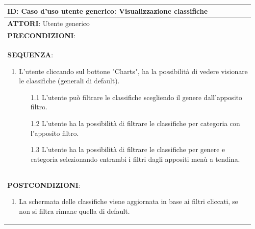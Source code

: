 \documentclass[a4paper,11pt]{report}
\begin{document}
\begin{table}[h!]
    \renewcommand*{\arraystretch}{1.2}
    \centering
    \begin{tabularx}{\textwidth}{|X|} \hline
      \textbf{ID}: Caso d'uso utente generico: 
      \newline 
      Visualizzazione classifiche \\
      \hline
      \textbf{ATTORI}: Utente generico \\
      \hline
      \textbf{PRECONDIZIONI}:\\
      \hline
      \textbf{SEQUENZA}:
      \begin{enumerate}
        \item L'utente cliccando sul bottone "Charts", ha la possibilità di vedere visionare le classifiche (generali di default).
        \begin{enumerate}
            \item [1.1] L'utente può filtrare le classifiche scegliendo il genere dall'apposito filtro.
            \item [1.2] L'utente ha la possibilità di filtrare le classifiche per categoria con l'apposito filtro.
             \item [1.3] L'utente ha la possibilità di filtrare le classifiche per genere e categoria selezionando entrambi i filtri dagli appositi menù a tendina.
         \end{enumerate}
      \end{enumerate}\\
      \hline
      \textbf{POSTCONDIZIONI}:
      \begin{enumerate}
        \item La schermata delle classifiche viene aggiornata in base ai filtri cliccati, se non si filtra rimane quella di default.
      \end{enumerate} \\
      \hline
    \end{tabularx}
  \end{table}
  
\clearpage
\end{document}
